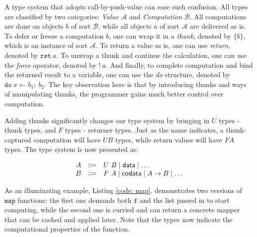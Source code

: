 \documentclass[acmsmall,nonacm]{acmart}
\begin{document}
\begin{listing}[h]
    \begin{multicols}{3}
        \inputminted{Haskell}{examples/mappre1.zydeco}
        \vfill
        \inputminted{Haskell}{examples/mappre2.zydeco}
        \vfill
    \end{multicols}
    \begin{multicols}{2}
        \inputminted{Haskell}{examples/map1.zydeco}
        \vfill
        \inputminted{Haskell}{examples/map2.zydeco}
        \vfill
    \end{multicols}
    \label{code: map}
\end{listing}

A type system that adopts call-by-push-value can ease such confusion. All types are classified by two categories: \textit{Value $\mathcal{A}$} and \textit{Computation $\mathcal{B}$}. All computations are done on objects $b$ of sort $\mathcal{B}$, while all objects $a$ of sort $\mathcal{A}$ are delivered as is. To defer or freeze a computation $b$, one can wrap it in a \textit{thunk}, denoted by $\{ b \}$, which is an instance of sort $\mathcal{A}$. To return a value as is, one can use \textit{return}, denoted by $\texttt{ret}~a$. To unwrap a thunk and continue the calculation, one can use the \textit{force} operator, denoted by $!~a$. And finally, to complete computation and bind the returned result to a variable, one can use the \textit{do} structure, denoted by $\texttt{do}~x \leftarrow b_1;~b_2$. The key observation here is that by introducing thunks and ways of manipulating thunks, the programmer gains much better control over computation.

Adding thunks significantly changes our type system by bringing in $U$ types - thunk types, and $F$ types - returner types. Just as the name indicates, a thunk-captured computation will have $U B$ types, while return values will have $F A$ types. The type system is now presented as:

\[\begin{array}{rcl}
    A & \Coloneqq & U ~B \mid \textsf{data} \mid \dots \\
    B & \Coloneqq & F ~A \mid \textsf{codata} \mid A \to B \mid \dots \\
\end{array}\]

As an illuminating example, Listing \ref{code: map}. demonstrates two versions of $\texttt{map}$ functions: the first one demands both $\texttt{f}$ and the list passed in to start computing, while the second one is curried and can return a concrete mapper that can be cached and applied later. Note that the types now indicate the computational properties of the function.
\end{document}
